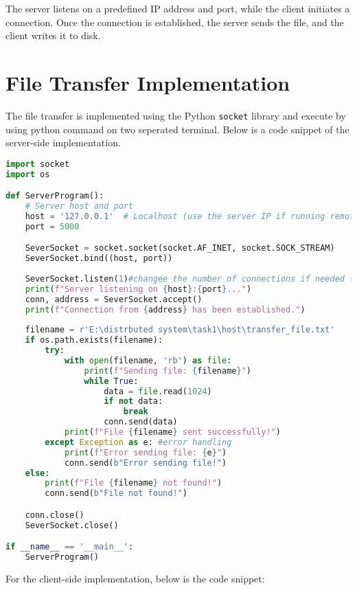 \documentclass[12pt]{article}
\begin{document}
The server listens on a predefined IP address and port, while the client initiates a connection. Once the connection is established, the server sends the file, and the client writes it to disk.

\section{File Transfer Implementation}
The file transfer is implemented using the Python \texttt{socket} library and execute by using python command on two seperated terminal. Below is a code snippet of the server-side implementation.

\begin{lstlisting}[language=Python, caption=Server-side Implementation]
import socket
import os

def ServerProgram():
    # Server host and port
    host = '127.0.0.1'  # Localhost (use the server IP if running remotely)
    port = 5000

    SeverSocket = socket.socket(socket.AF_INET, socket.SOCK_STREAM)
    SeverSocket.bind((host, port))
    
    SeverSocket.listen(1)#changee the number of connections if needed (i set 1 as default)
    print(f"Server listening on {host}:{port}...")
    conn, address = SeverSocket.accept()
    print(f"Connection from {address} has been established.")
    
    filename = r'E:\distrbuted system\task1\host\transfer_file.txt' 
    if os.path.exists(filename):
        try:
            with open(filename, 'rb') as file:
                print(f"Sending file: {filename}")
                while True:
                    data = file.read(1024)
                    if not data:
                        break  
                    conn.send(data)  
            print(f"File {filename} sent successfully!")
        except Exception as e: #error handling
            print(f"Error sending file: {e}")
            conn.send(b"Error sending file!")
    else:
        print(f"File {filename} not found!")
        conn.send(b"File not found!") 

    conn.close()
    SeverSocket.close()  

if __name__ == '__main__':
    ServerProgram()
\end{lstlisting}

For the client-side implementation, below is the code snippet:
\end{document}

